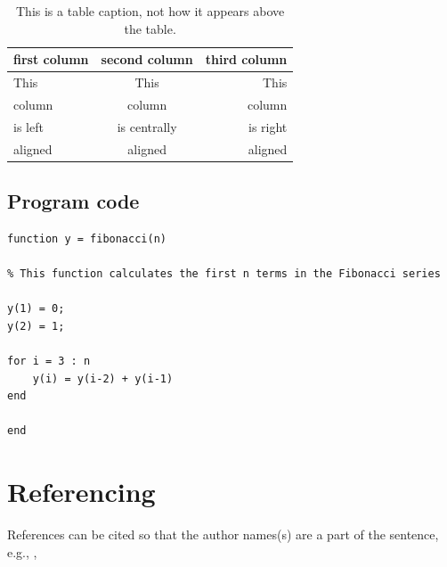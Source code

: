 \begin{table}[H]
	\caption{This is a table caption, not how it appears above the table.}
	\label{tab:table label} %
	\begin{center}
		\begin{tabular}{lcr} %
			\toprule %
			first column & second column & third column \\
			\midrule %
			This & This & This \\
			column & column & column \\
			is left & is centrally & is right \\
			aligned & aligned & aligned \\
			\bottomrule %
		\end{tabular}
	\end{center}
\end{table}

\subsection{Program code}

\begin{lstlisting}[style=matlabcode,
    caption = A MATLAB function to compute the first $n$ numbers of the Fibonacci series,
    label = mat:fibonacci
    ]
function y = fibonacci(n)

% This function calculates the first n terms in the Fibonacci series

y(1) = 0;
y(2) = 1;

for i = 3 : n
    y(i) = y(i-2) + y(i-1)
end

end
\end{lstlisting}

\section{Referencing}
References can be cited so that the author names(s) are a part of the sentence, e.g., \cite{stroud:2013}, \cite{harten:1983}

